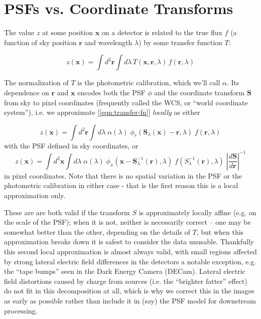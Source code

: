 \documentclass[DM,authoryear,toc]{lsstdoc}
\begin{document}
\section{PSFs vs. Coordinate Transforms}

\label{sec:psfs-vs-coordinate-transforms}

The value $z$ at some position $\mathbf{x}$ on a detector is related to the true flux $f$ (a function of sky position $\mathbf{r}$ and wavelength $\lambda$) by some transfer function $T$:

\begin{equation}
  z(\mathbf{x}) = \int\!\! d^2 \mathbf{r} \int\!\! d\!\lambda
    \, T(\mathbf{x},\mathbf{r},\lambda)
    \, f(\mathbf{r},\lambda)
  \label{eqn:transfer-fn}
\end{equation}

The normalization of $T$ is the photometric calibration, which we'll call $\alpha$.
Its dependence on $\mathbf{r}$ and $\mathbf{x}$ encodes both the PSF $\phi$ and the coordinate transform $\mathbf{S}$ from sky to pixel coordinates (frequently called the WCS, or ``world coordinate system''), i.e. we approximate [\ref{eqn:transfer-fn}] \emph{locally} as either

\begin{equation}
  z(\mathbf{x}) =  \int\!\! d^2 \mathbf{r} \int\!\! d\!\lambda
    \; \alpha(\lambda)
    \; \phi_r\!\left(\mathbf{S}_\lambda(\mathbf{x}) - \mathbf{r}, \lambda\right)
    \; f\!\left(\mathbf{r}, \lambda\right)
\end{equation}
with the PSF defined in sky coordinates, or
\begin{equation}
  z(\mathbf{x}) =  \int\!\! d^2 \mathbf{x} \int\!\! d\!\lambda
    \;\alpha(\lambda)
    \; \phi_x\!\left(\mathbf{x} - \mathbf{S}_\lambda^{-1}(\mathbf{r}), \lambda\right)
    \; f\!\left(S^{-1}_\lambda(\mathbf{r}), \lambda\right)
    \; \left|\frac{d \mathbf{S}}{d\mathbf{r}}\right|^{-1}
\end{equation}
in pixel coordinates.
Note that there is no spatial variation in the PSF or the photometric calibration in either case - that is the first reason this is a local approximation only.

These are are both valid if the transform $S$ is approximately locally affine (e.g. on the scale of the PSF); when it is not, neither is necessarily correct -- one may be somewhat better than the other, depending on the details of $T$, but when this approximation breaks down it is safest to consider the data unusable.
Thankfully this second local approximation is almost always valid, with small regions affected by strong lateral electric field differences in the detectors a notable exception, e.g. the ``tape bumps'' seen in the Dark Energy Camera (DECam).
Lateral electric field distortions caused by charge from sources (i.e. the ``brighter fatter'' effect) do not fit in this decomposition at all, which is why we correct this in the images as early as possible rather than include it in (say) the PSF model for downstream processing.
\end{document}
